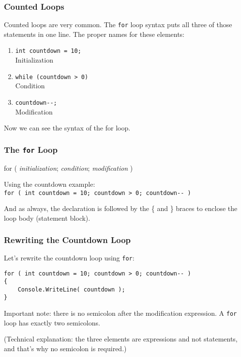\begin{frame}
\frametitle{Counted Loops}
Counted loops are very common. The \texttt{for} loop syntax puts all three of those statements in one line. The proper names for these elements:

\begin{enumerate}
	\item \texttt{int countdown = 10;}\\
		\quad \alert{Initialization}
	\item \texttt{while (countdown > 0)}\\
		\quad \alert{Condition}
	\item \texttt{countdown{-}{-};}\\
		\quad \alert{Modification}
\end{enumerate}

Now we can see the syntax of the for loop.

\end{frame}

\begin{frame}
\frametitle{The \texttt{for} Loop}

for ( \textit{initialization}; \textit{condition}; \textit{modification} )

Using the countdown example:\\
\quad \texttt{for ( int countdown = 10; countdown > 0; countdown{-}{-} )}

And as always, the declaration is followed by the \{ and \} braces to enclose the loop body (statement block).

\end{frame}

\begin{frame}[fragile]
\frametitle{Rewriting the Countdown Loop}

Let's rewrite the countdown loop using \texttt{for}:

\begin{verbatim}
for ( int countdown = 10; countdown > 0; countdown-- )
{
    Console.WriteLine( countdown );
}
\end{verbatim}

Important note: there is no semicolon after the modification expression. A \texttt{for} loop has exactly two semicolons.

(Technical explanation: the three elements are expressions and not statements, and that's why no semicolon is required.)

\end{frame}

